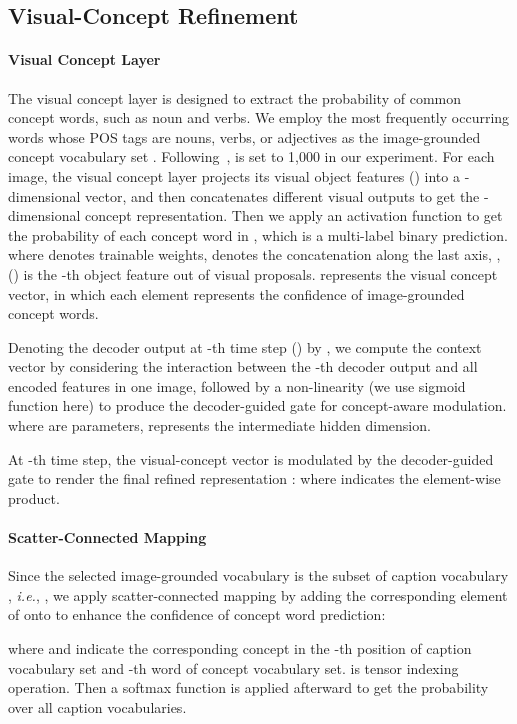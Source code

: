 \documentclass[11pt]{article}
\begin{document}
\subsection{Visual-Concept Refinement}
\label{subsec:refine}
\paragraph{Visual Concept Layer} The visual concept layer is designed to extract the probability of common concept words, such as noun and verbs. We employ the  most frequently occurring words whose POS tags are nouns, verbs, or adjectives as the image-grounded concept vocabulary set . Following~\cite{gan2017semantic},  is set to 1,000 in our experiment. For each image, the visual concept layer projects its visual object features  () into a -dimensional vector, and then concatenates  different visual outputs to get the -dimensional concept representation. Then we apply an activation function to get the probability of each concept word in , which is a multi-label binary prediction.
{where  denotes trainable weights,  denotes the concatenation along the last axis, ,  () is the -th object feature out of  visual proposals.   represents the visual concept vector, in which each element represents the confidence of image-grounded concept words.}

Denoting the decoder output at -th time step () by , we compute the context vector  by considering the interaction between the -th decoder output and all encoded features  in one image, followed by a non-linearity  (we use sigmoid function here) to produce the decoder-guided gate for concept-aware modulation.
{where  are parameters,  represents the intermediate hidden dimension.}

At -th time step, the visual-concept vector  is modulated by the decoder-guided gate  to render the final refined representation :
{where  indicates the element-wise product.}

\paragraph{Scatter-Connected Mapping} Since the selected image-grounded vocabulary  is the subset of caption vocabulary , \emph{i.e.}, , we apply scatter-connected mapping by adding the corresponding element of  onto  to enhance the confidence of concept word prediction:

{where  and  indicate the corresponding concept in the -th position of caption vocabulary set and -th word of concept vocabulary set.  is tensor indexing operation.}
Then a softmax function is applied afterward to get the probability over all caption vocabularies. 
\end{document}
